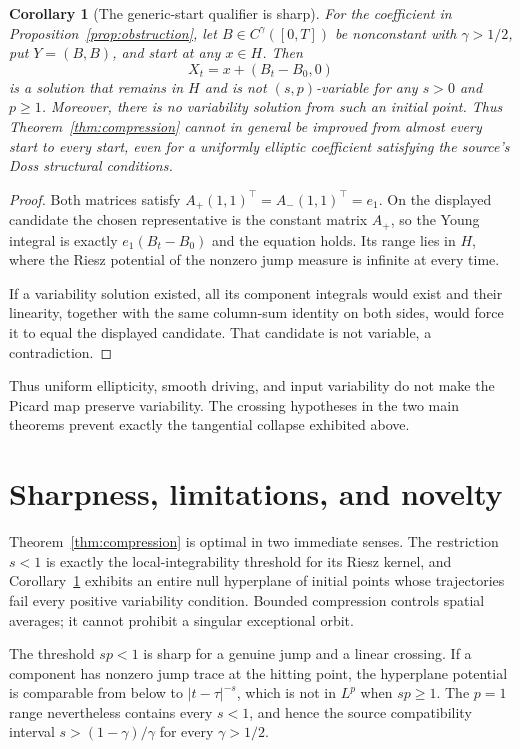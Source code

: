 \documentclass[11pt]{article}
\newtheorem{corollary}{Corollary}
\begin{document}
\begin{corollary}[The generic-start qualifier is sharp]
\label{cor:exceptional}
For the coefficient in Proposition~\ref{prop:obstruction}, let
$B\in C^\gamma([0,T])$ be nonconstant with $\gamma>1/2$, put
$Y=(B,B)$, and start at any $x\in H$.  Then
\[
 X_t=x+(B_t-B_0,0)
\]
is a solution that remains in $H$ and is not $(s,p)$-variable for any
$s>0$ and $p\geq1$.  Moreover, there is no variability solution from such
an initial point.  Thus Theorem~\ref{thm:compression} cannot in general be
improved from almost every start to every start, even for a uniformly elliptic
coefficient satisfying the source's Doss structural conditions.
\end{corollary}

\begin{proof}
Both matrices satisfy
$A_+(1,1)^\top=A_-(1,1)^\top=e_1$.  On the displayed candidate the chosen
representative is the constant matrix $A_+$, so the Young integral is exactly
$e_1(B_t-B_0)$ and the equation holds.  Its range lies in $H$, where the
Riesz potential of the nonzero jump measure is infinite at every time.

If a variability solution existed, all its component integrals would exist
and their linearity, together with the same column-sum identity on both sides,
would force it to equal the displayed candidate.  That candidate is not
variable, a contradiction.
\end{proof}

Thus uniform ellipticity, smooth driving, and input variability do not make the
Picard map preserve variability.  The crossing hypotheses in the two main
theorems prevent exactly the tangential collapse exhibited above.

\section{Sharpness, limitations, and novelty}

Theorem~\ref{thm:compression} is optimal in two immediate senses.  The
restriction $s<1$ is exactly the local-integrability threshold for its Riesz
kernel, and Corollary~\ref{cor:exceptional} exhibits an entire null
hyperplane of initial points whose trajectories fail every positive
variability condition.  Bounded compression controls spatial averages; it
cannot prohibit a singular exceptional orbit.

The threshold $sp<1$ is sharp for a genuine jump and a linear crossing.  If a
component has nonzero jump trace at the hitting point, the hyperplane potential
is comparable from below to $|t-\tau|^{-s}$, which is not in $L^p$ when
$sp\geq1$.  The $p=1$ range nevertheless contains every $s<1$, and hence the
source compatibility interval $s>(1-\gamma)/\gamma$ for every
$\gamma>1/2$.
\end{document}
